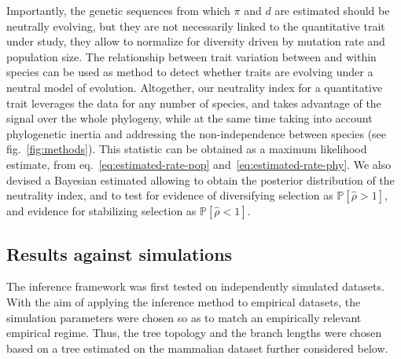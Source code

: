 \documentclass{article}
\newcommand{\proba}{\mathbb{P}}
\newcommand{\EstNI}{\widehat{\rho}}
\begin{document}
Importantly, the genetic sequences from which $\pi$ and $d$ are estimated should be neutrally evolving, but they are not necessarily linked to the quantitative trait under study, they allow to normalize for diversity driven by mutation rate and population size.
The relationship between trait variation between and within species can be used as method to detect whether traits are evolving under a neutral model of evolution.
Altogether, our neutrality index for a quantitative trait leverages the data for any number of species, and takes advantage of the signal over the whole phylogeny, while at the same time taking into account phylogenetic inertia and addressing the non-independence between species (see fig.~\ref{fig:methods}).
This statistic can be obtained as a maximum likelihood estimate, from eq.~\ref{eq:estimated-rate-pop} and~\ref{eq:estimated-rate-phy}.
We also devised a Bayesian estimated allowing to obtain the posterior distribution of the neutrality index, and to test for evidence of diversifying selection as $\proba [\EstNI > 1]$, and evidence for stabilizing selection as $\proba [\EstNI < 1]$.

\subsection{Results against simulations}

The inference framework was first tested on independently simulated datasets.
With the aim of applying the inference method to empirical datasets, the simulation parameters were chosen so as to match an empirically relevant empirical regime.
Thus, the tree topology and the branch lengths were chosen based on a tree estimated on the mammalian dataset further considered below.
\end{document}
